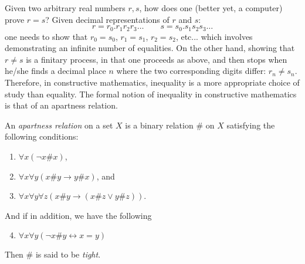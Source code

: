 \documentclass[12pt]{article}
\begin{document}
Given two arbitrary real numbers $r,s$, how does one (better yet, a computer) prove $r=s$?  Given decimal representations of $r$ and $s$: $$r=r_0.r_1 r_2 r_3 \ldots\qquad s=s_0.s_1 s_2 s_3 \ldots$$
one needs to show that $r_0 =s_0$, $r_1=s_1$, $r_2=s_2$, etc... which involves demonstrating an infinite number of equalities.  On the other hand, showing that $r\ne s$ is a finitary process, in that one proceeds as above, and then stops when he/she finds a decimal place $n$ where the two corresponding digits differ: $r_n \ne s_n$.  Therefore, in constructive mathematics, inequality is a more appropriate choice of study than equality.  The formal notion of inequality in constructive mathematics is that of an apartness relation.

An \emph{apartness relation} on a set $X$ is a binary relation $\#$ on $X$ satisfying the following conditions:
\begin{enumerate}
\item $\forall x (\neg x \#x) $,
\item $\forall x \forall y (x \#y  \to y \#x )$, and
\item $\forall x \forall y \forall z (x \# y \to (x \# z \lor y \#z))$.
\end{enumerate}
And if in addition, we have the following
\begin{enumerate}
\setcounter{enumi}{3}
\item $\forall x \forall y(\neg x \# y \leftrightarrow x=y) $
\end{enumerate}
Then $\#$ is said to be \emph{tight}.
\end{document}
